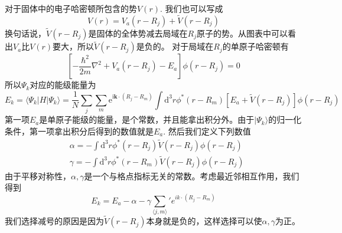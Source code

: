 \documentclass{article}
\numberwithin{equation}{subsection}
\begin{document}
对于固体中的电子哈密顿所包含的势$V(r)$. 我们也可以写成
\begin{equation}
    V(r)=V_a(r-R_j)+\tilde{V}(r-R_j)
\end{equation}
换句话说，$\tilde{V}(r-R_j)$是固体的全体势减去局域在$R_j$原子的势。从图表中可以看出$V_a$比$V(r)$要大，所以$\tilde{V}(r-R_j)$是负的。
对于局域在$R_j$的单原子哈密顿有
\begin{equation}
    \left[-\frac{\hbar^{2}}{2 m} \nabla^{2}+V_{a}\left(r-R_{j}\right)-E_{a}\right] \phi\left(r-R_{j}\right)=0
\end{equation}
所以$\Psi_k$对应的能级能量为
\begin{equation}
    E_k=\langle\Psi_k|H|\Psi_k\rangle=\frac{1}{N} \sum_{j} \sum_{m} \mathrm{e}^{\mathrm{i} \mathbf{k} \cdot\left(R_{j}-R_{m}\right)} \int \mathrm{d}^{3} r \phi^{*}\left(r-R_{m}\right)\left[E_{a}+\tilde{V}\left(r-R_{j}\right)\right] \phi\left(r-R_{j}\right)
\end{equation}
第一项$E_a$是单原子能级的能量，是个常数，并且能拿出积分外。由于$|\Psi_k\rangle$的归一化条件，第一项拿出积分后得到的数值就是$E_a$. 然后我们定义下列数值
\begin{equation}
    \begin{aligned}
        &\alpha=-\int \mathrm{d}^{3} r \phi^{*}\left(r-R_{j}\right) \tilde{V}\left(r-R_{j}\right) \phi\left(r-R_{j}\right)\\
        &\gamma=-\int \mathrm{d}^{3} r \phi^{*}\left(r-R_{m}\right) \tilde{V}\left(r-R_{j}\right) \phi\left(r-R_{j}\right)
    \end{aligned}
\end{equation}
由于平移对称性，$\alpha,\gamma$是一个与格点指标无关的常数。考虑最近邻相互作用，我们得到
\begin{equation}
    E_k=E_a-\alpha-\gamma\sum_{\langle j,m\rangle}'e^{ik\cdot(R_j-R_m)}
\end{equation}
我们选择减号的原因是因为$\tilde{V}(r-R_j)$本身就是负的，这样选择可以使$\alpha,\gamma$为正。
\end{document}
